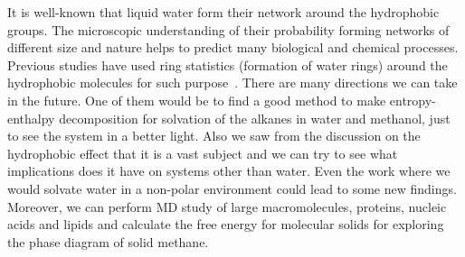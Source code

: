  It is well-known that liquid water form their network around the hydrophobic groups. The microscopic understanding of their  probability forming networks of different size and  nature helps to predict many biological and chemical processes. Previous studies   have used ring statistics (formation of water rings) around the hydrophobic molecules for such purpose~\citep{Hassanali2013}.  There are many directions we can take in the future. One of them would be to find a good  method to make entropy-enthalpy decomposition for solvation of the alkanes in water and methanol, just to  see the system in a better light. Also we saw from the discussion on the hydrophobic effect that  it is a vast subject and we can try to see what implications does it have on systems other than  water. Even the work where we would solvate water in a non-polar environment could lead to  some new findings. Moreover,  we can perform MD study of large macromolecules, proteins,  nucleic acids and  lipids and  calculate the free energy for molecular solids for exploring the phase diagram of solid methane.


 






